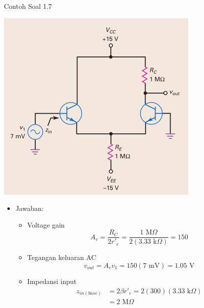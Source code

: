 \documentclass[aspectratio=169]{beamer}
\begin{document}
\begin{frame}{Contoh Soal 1.7}
	\begin{multicols}{2}
		\begin{center}
			\includegraphics[height=0.7\textheight]{gambar/01.contoh_soal_07}
		\end{center}
		\columnbreak
		\begin{itemize}
			\item Jawaban:
			\begin{itemize}
				\item Voltage gain
				\[ A_v = \frac{R_C}{2r'_e} = \frac{1 \text{ M}\Omega }{2 (3.33 \text{ k}\Omega) } = 150 \]
				\item Tegangan keluaran AC
				\[ v_{out} = A_v v_1 = 150(7 \text{ mV}) = 1.05 \text{ V} \]
				\item Impedansi input
				\begin{align*}
					z_{in(base)} &= 2 \beta r'_e = 2(300)(3.33 \text{ k}\Omega) \\
					&= 2 \text{ M}\Omega
				\end{align*}
			\end{itemize}
		\end{itemize}
	\end{multicols}
\end{frame}
\end{document}
